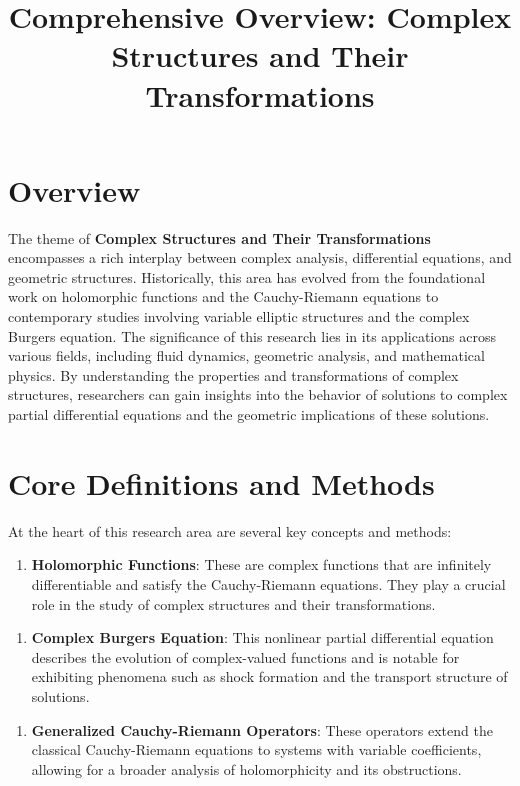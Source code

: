 \documentclass[11pt,a4paper]{article}
\title{Comprehensive Overview: Complex Structures and Their Transformations}
\date{}
\begin{document}
\maketitle

\section{Overview}

The theme of \textbf{Complex Structures and Their Transformations} encompasses a rich interplay between complex analysis, differential equations, and geometric structures. Historically, this area has evolved from the foundational work on holomorphic functions and the Cauchy-Riemann equations to contemporary studies involving variable elliptic structures and the complex Burgers equation. The significance of this research lies in its applications across various fields, including fluid dynamics, geometric analysis, and mathematical physics. By understanding the properties and transformations of complex structures, researchers can gain insights into the behavior of solutions to complex partial differential equations and the geometric implications of these solutions.

\section{Core Definitions and Methods}

At the heart of this research area are several key concepts and methods:

\begin{enumerate}
\item \textbf{Holomorphic Functions}: These are complex functions that are infinitely differentiable and satisfy the Cauchy-Riemann equations. They play a crucial role in the study of complex structures and their transformations.
\end{enumerate}

\begin{enumerate}
\item \textbf{Complex Burgers Equation}: This nonlinear partial differential equation describes the evolution of complex-valued functions and is notable for exhibiting phenomena such as shock formation and the transport structure of solutions.
\end{enumerate}

\begin{enumerate}
\item \textbf{Generalized Cauchy-Riemann Operators}: These operators extend the classical Cauchy-Riemann equations to systems with variable coefficients, allowing for a broader analysis of holomorphicity and its obstructions.
\end{enumerate}
\end{document}
